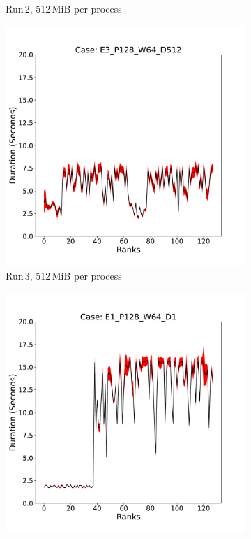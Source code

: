 \begin{figure}[h!]
\begin{subfigure}[b]{0.3\textwidth}
         \caption{Run\,2, 512\,MiB per process}
         \label{fig:E2_512_d2}
     \end{subfigure}
      \hfill
     \begin{subfigure}[b]{0.3\textwidth}
         \centering
         \includegraphics[width=\textwidth, height=\textwidth]{figures/deisa2__E3_P128_W64_D512.pdf}
         \caption{Run\,3, 512\,MiB per process}
         \label{fig:E3_512_d2}
     \end{subfigure}
     \vfill
          \begin{subfigure}[b]{0.3\textwidth}
         \centering
         \includegraphics[width=\textwidth, height=\textwidth]{figures/deisa2__E1_P128_W64_D1.pdf}

\end{subfigure}
\end{figure}
